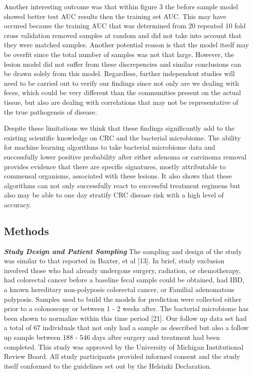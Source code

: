 \documentclass[12pt,]{article}
\begin{document}
Another interesting outcome was that within figure 3 the before sample
model showed better test AUC results then the training set AUC. This may
have occured because the training AUC that was determined from 20
repeated 10 fold cross validation removed samples at random and did not
take into account that they were matched samples. Another potential
reason is that the model itself may be overfit since the total number of
samples was not that large. However, the lesion model did not suffer
from these discrepencies and similar conclusions can be drawn solely
from this model. Regardless, further independent studies will need to be
carried out to verify our findings since not only are we dealing with
feces, which could be very different than the communities present on the
actual tissue, but also are dealing with correlations that may not be
representative of the true pathogensis of disease.

Despite these limitations we think that these findings significantly add
to the existing scientific knowledge on CRC and the bacterial
microbiome. The ability for machine learning algorithms to take
bacterial microbiome data and successfully lower positive probability
after either adenoma or carcinoma removal provides evidence that there
are specific signatures, mostly attributable to commensal organisms,
associated with these lesions. It also shows that these algorithms can
not only successfully react to successful treatment regimens but also
may be able to one day stratify CRC disease risk with a high level of
accuracy.

\newpage

\subsection{Methods}\label{methods}

\textbf{\emph{Study Design and Patient Sampling}} The sampling and
design of the study was similar to that reported in Baxter, et al
{[}13{]}. In brief, study exclusion involved those who had already
undergone surgery, radiation, or chemotherapy, had colorectal cancer
before a baseline fecal sample could be obtained, had IBD, a known
hereditary non-polyposis colorectal cancer, or Familial adenomatous
polyposis. Samples used to build the models for prediction were
collected either prior to a colonoscopy or between 1 - 2 weeks after.
The bacterial microbiome has been shown to normalize within this time
period {[}21{]}. Our follow up data set had a total of 67 individuals
that not only had a sample as described but also a follow up sample
between 188 - 546 days after surgery and treatment had been completed.
This study was approved by the University of Michigan Institutional
Review Board. All study participants provided informed consent and the
study itself conformed to the guidelines set out by the Helsinki
Declaration.
\end{document}
